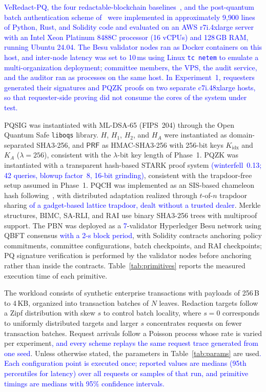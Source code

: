 \documentclass[lettersize,journal]{IEEEtran}
\newcommand{\chg}[1]{\textcolor{blue}{#1}}
\begin{document}
    \chg{VeRedact-PQ, the four redactable-blockchain
    baselines~\cite{ref1,ref13,ref27,ref34}, and the post-quantum batch
    authentication scheme of~\cite{ref39} were
    implemented in approximately 9{,}900 lines of Python, Rust, and Solidity
    code and evaluated on an AWS \chg{r7i.4xlarge} server with an Intel Xeon
    Platinum 8488C processor (16 vCPUs) and \chg{128}\,GB RAM, running Ubuntu 24.04.
    The Besu validator nodes ran as Docker containers on this host, and
    inter-node latency was set to 10\,ms using Linux \texttt{tc netem} to
    emulate a multi-organization deployment; committee members, the VPS, the
    audit service, and the auditor ran as processes on the same host. In
    Experiment~1, requesters generated their signatures and PQZK proofs on
    two separate c7i.48xlarge hosts, so that requester-side proving did not
    consume the cores of the system under test.}

    PQSIG was instantiated with ML-DSA-65 (FIPS~204) through the Open Quantum
    Safe \texttt{liboqs} library. $H$, $H_1$, $H_2$, and $H_A$ were
    instantiated as domain-separated SHA3-256, and $\mathsf{PRF}$ as
    HMAC-SHA3-256 with 256-bit keys $K_{\mathrm{idx}}$
    and $K_A$ { ($\lambda=256$)}, consistent with the {$\lambda$}-bit key length of Phase~1. PQZK was instantiated with a transparent hash-based
    STARK proof system \chg{(winterfell~0.13; 42 queries, blowup factor~8,
    16-bit grinding)}, consistent with the
    trapdoor-free setup assumed in Phase~1. PQCH was implemented as an
    SIS-based chameleon hash following~\cite{ref10,ref17}, with distributed
    adaptation realized through $t$-of-$n$ trapdoor sharing
    \chg{of a gadget-based lattice trapdoor, dealt without a trusted dealer}. Merkle structures, BIMC, SA-RLI,
    and RAI use binary SHA3-256 trees with multiproof support. The PBN was
    deployed as a \chg{7}-validator Hyperledger Besu network using
    QBFT consensus \chg{with a 2-s block period}, with Solidity contracts anchoring policy commitments,
    committee configurations, batch checkpoints, and RAI checkpoints; PQ
    signature verification is performed by the validator nodes before
    anchoring rather than inside the contracts. Table~\ref{tab:primitives}
    reports the measured execution time of each primitive.

    The workload consists of synthetic enterprise transactions with payloads
    of 256\,B to 4\,KB, organized into transaction batches of $N$ leaves.
    Redaction targets follow a Zipf distribution with skew $s$ to control
    batch locality, where $s=0$ corresponds to uniformly distributed targets
    and larger $s$ concentrates requests on fewer transaction batches.
    Request arrivals follow a Poisson process whose rate is varied per
    experiment\chg{, and every scheme replays the same request trace generated
    from one seed}.
    Unless otherwise stated, the parameters in Table~\ref{tab:params} are
    used\chg{. Each configuration point is executed once; reported values are
    medians (95th percentiles for latency) over all requests or samples of
    that run, and primitive timings are medians with 95\% confidence
    intervals.}
\end{document}
